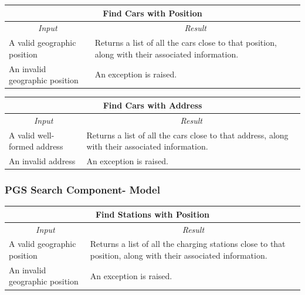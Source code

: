 \documentclass[english]{article}
\begin{document}
\begin{center}
	\begin{tabular}{ | p{6cm} | p{6cm} | }
		\hline
		\multicolumn{2}{|c|}{\textbf{Find Cars with Position}} \\
		\hline
		\multicolumn{1}{|c|}{\textit{Input}} & \multicolumn{1}{c|}{\textit{Result}} \\
		\hline
		A valid geographic position & Returns a list of all the cars close to that position, along with their associated information. \\
		\hline
		An invalid geographic position & An exception is raised. \\
		\hline
	\end{tabular}
\end{center}

\begin{center}
	\begin{tabular}{ | p{6cm} | p{6cm} | }
		\hline 
		\multicolumn{2}{|c|}{\textbf{Find Cars with Address}} \\
		\hline
		\multicolumn{1}{|c|}{\textit{Input}} & \multicolumn{1}{c|}{\textit{Result}} \\
		\hline
		A valid well-formed address & Returns a list of all the cars close to that address, along with their associated information. \\
		\hline
		An invalid address & An exception is raised. \\
		\hline
	\end{tabular}
\end{center}

\subsubsection{PGS Search Component- Model}


\begin{center}
	\begin{tabular}{ | p{6cm} | p{6cm} | }
		\hline 
		\multicolumn{2}{|c|}{\textbf{Find Stations with Position}} \\
		\hline
		\multicolumn{1}{|c|}{\textit{Input}} & \multicolumn{1}{c|}{\textit{Result}} \\
		\hline
		A valid geographic position & Returns a list of all the charging stations close to that position, along with their associated information. \\
		\hline
		An invalid geographic position & An exception is raised. \\
		\hline
	\end{tabular}
\end{center}
\end{document}
